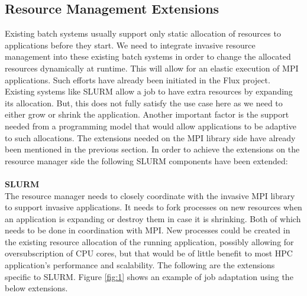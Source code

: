 \subsection{Resource Management Extensions}
Existing batch systems usually support only static allocation of resources to applications before they start. We need to integrate invasive resource management into these existing batch systems in order to change the allocated resources dynamically at runtime. This will allow for an elastic execution of MPI applications. Such efforts have already been initiated in the Flux project\cite{schulz}. Existing systems like SLURM allow a job to have extra resources by expanding its allocation. But, this does not fully satisfy the use case here as we need to either grow or shrink the application. Another important factor is the support needed from a programming model that would allow applications to be adaptive to such allocations. The extensions needed on the MPI library side have already been mentioned in the previous section. In order to achieve the extensions on the resource manager side the following SLURM components have been extended:\\ \\
\textbf{SLURM}\\
The resource manager needs to closely coordinate with the invasive MPI library to support invasive applications. It needs to fork processes on new resources when an application is expanding or destroy them in case it is shrinking. Both of which needs to be done in coordination with MPI. New processes could be created in the existing resource allocation of the running application, possibly allowing for oversubscription of CPU cores, but that would be of little benefit to most HPC application's performance and scalability. The following are the extensions specific to SLURM. Figure \ref{fig:1} shows an example of job adaptation using the below extensions.\\ \\
